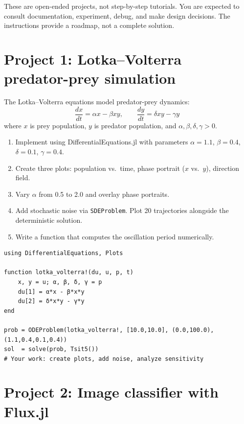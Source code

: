 \begin{warningbox}
These are open-ended projects, not step-by-step tutorials. You are expected to consult documentation, experiment, debug, and make design decisions. The instructions provide a roadmap, not a complete solution.
\end{warningbox}

\section{Project 1: Lotka--Volterra predator-prey simulation}

The Lotka--Volterra equations model predator-prey dynamics:
\[
\frac{dx}{dt} = \alpha x - \beta xy, \qquad \frac{dy}{dt} = \delta xy - \gamma y
\]
where $x$ is prey population, $y$ is predator population, and $\alpha,\beta,\delta,\gamma > 0$.

\begin{enumerate}
  \item Implement using DifferentialEquations.jl with parameters $\alpha=1.1$, $\beta=0.4$, $\delta=0.1$, $\gamma=0.4$.
  \item Create three plots: population vs.\ time, phase portrait ($x$ vs.\ $y$), direction field.
  \item Vary $\alpha$ from 0.5 to 2.0 and overlay phase portraits.
  \item Add stochastic noise via \texttt{SDEProblem}. Plot 20 trajectories alongside the deterministic solution.
  \item Write a function that computes the oscillation period numerically.
\end{enumerate}

\begin{verbatim}
using DifferentialEquations, Plots

function lotka_volterra!(du, u, p, t)
    x, y = u; α, β, δ, γ = p
    du[1] = α*x - β*x*y
    du[2] = δ*x*y - γ*y
end

prob = ODEProblem(lotka_volterra!, [10.0,10.0], (0.0,100.0), (1.1,0.4,0.1,0.4))
sol  = solve(prob, Tsit5())
# Your work: create plots, add noise, analyze sensitivity
\end{verbatim}

\section{Project 2: Image classifier with Flux.jl}

